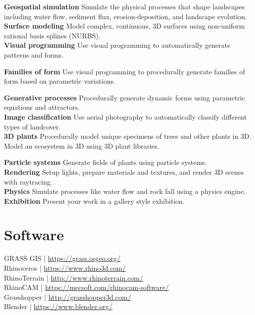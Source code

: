 \documentclass[11pt,article,oneside]{memoir}
\begin{document}
\noindent \textbf{Geospatial simulation}
Simulate the physical processes that shape landscapes including
water flow, sediment flux, erosion-deposition, and landscape evolution.\\

\noindent \textbf{Surface modeling}
Model complex, continuous, 3D surfaces 
using non-uniform rational basis splines (NURBS).\\

\noindent \textbf{Visual programming}
Use visual programming to automatically generate
patterns and forms.
%
\nocite{*} \printbibliography[keyword=algorithmic, heading=none]
\vspace*{0.5em}

\noindent \textbf{Families of form}
Use visual programming to procedurally generate families of form
based on parametric variations.
%
\nocite{*} \printbibliography[keyword=procedural, heading=none]
\vspace*{0.5em}

\noindent \textbf{Generative processes}
Procedurally generate dynamic forms using 
parametric equations and attractors.\\

\noindent \textbf{Image classification}
Use aerial photography to automatically classify 
different types of landcover.\\

\noindent \textbf{3D plants}
Procedurally model unique specimens 
of trees and other plants in 3D.
Model an ecosystem in 3D using 3D plant libraries.
%
\nocite{*} \printbibliography[keyword=plants, heading=none]
\vspace*{0.5em}

\noindent \textbf{Particle systems}
Generate fields of plants 
using particle systems. \\

\noindent \textbf{Rendering}
Setup lights, prepare materials and textures, 
and render 3D scenes with raytracing.\\

\noindent \textbf{Physics}
Simulate processes like water flow and rock fall
using a physics engine.\\

\noindent \textbf{Exhibition}
Present your work in a gallery style exhibition.\\


\section{Software}
GRASS GIS | \url{https://grass.osgeo.org/} \\
Rhinoceros | \url{https://www.rhino3d.com/}\\
RhinoTerrain | \url{http://www.rhinoterrain.com/}\\
RhinoCAM | \url{https://mecsoft.com/rhinocam-software/}\\
Grasshopper | \url{http://grasshopper3d.com/}\\
Blender | \url{https://www.blender.org/}\\
\end{document}

